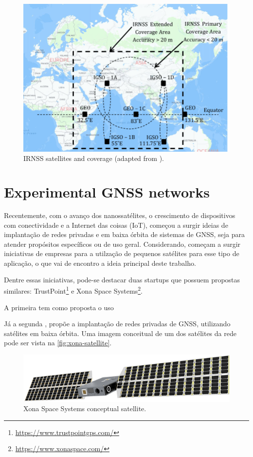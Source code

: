 \begin{figure}[!ht]
    \begin{center}
        \includegraphics[width=0.8\columnwidth]{figures/irnss}
        \caption{IRNSS satellites and coverage (adapted from \cite{thombre2015}).}
        \label{fig:irnss}
    \end{center}
\end{figure}

\section{Experimental GNSS networks}

Recentemente, com o avanço dos nanossatélites, o crescimento de dispositivos com conectividade e a Internet das coisas (IoT), começou a surgir ideias de implantação de redes privadas e em baixa órbita de sistemas de GNSS, seja para atender propósitos específicos ou de uso geral. Considerando, começam a surgir iniciativas de empresas para a utilzação de pequenos satélites para esse tipo de aplicação, o que vai de encontro a ideia principal deste trabalho.

Dentre essas iniciativas, pode-se destacar duas startups que possuem propostas similares: TrustPoint\footnote{\href{https://www.trustpointgps.com/}{https://www.trustpointgps.com/}} e Xona Space Systems\footnote{\href{https://www.xonaspace.com/}{https://www.xonaspace.com/}}.

A primeira tem como proposta o uso 

Já a segunda \cite{aarestad2020}, propõe a implantação de redes privadas de GNSS, utilizando satélites em baixa órbita. Uma imagem conceitual de um dos satélites da rede pode ser vista na \autoref{fig:xona-satellite}.

\begin{figure}[!ht]
    \begin{center}
        \includegraphics[width=0.8\columnwidth]{figures/xona-satellite}
        \caption{Xona Space Systems conceptual satellite.}
        \label{fig:xona-satellite}
    \end{center}
\end{figure}

